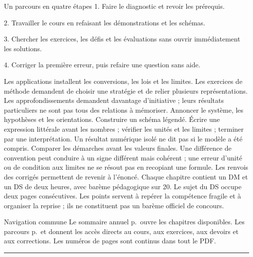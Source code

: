 \thispagestyle{mpsiFront}
\begin{loi}{Un parcours en quatre étapes}
1. Faire le diagnostic et revoir les prérequis.\par
2. Travailler le cours en refaisant les démonstrations et les schémas.\par
3. Chercher les exercices, les défis et les évaluations sans ouvrir immédiatement les solutions.\par
4. Corriger la première erreur, puis refaire une question sans aide.
\end{loi}
Les applications installent les conversions, les lois et les limites. Les exercices de méthode demandent de choisir une stratégie et de relier plusieurs représentations. Les approfondissements demandent davantage d’initiative ; leurs résultats particuliers ne sont pas tous des relations à mémoriser.
Annoncer le système, les hypothèses et les orientations. Construire un schéma légendé. Écrire une expression littérale avant les nombres ; vérifier les unités et les limites ; terminer par une interprétation. Un résultat numérique isolé ne dit pas si le modèle a été compris.
Comparer les démarches avant les valeurs finales. Une différence de convention peut conduire à un signe différent mais cohérent ; une erreur d’unité ou de condition aux limites ne se résout pas en recopiant une formule. Les renvois des corrigés permettent de revenir à l’énoncé.
Chaque chapitre contient un DM et un DS de deux heures, avec barème pédagogique sur 20. Le sujet du DS occupe deux pages consécutives. Les points servent à repérer la compétence fragile et à organiser la reprise ; ils ne constituent pas un barème officiel de concours.
\begin{methode}{Navigation commune}
Le sommaire annuel p.\,\pageref{sommaire-livre} ouvre les chapitres disponibles. Les parcours p.\,\pageref{navigation-1} et \pageref{navigation-2} donnent les accès directs au cours, aux exercices, aux devoirs et aux corrections. Les numéros de pages sont continus dans tout le PDF.
\end{methode}


\thispagestyle{mpsiFront}
\begingroup\setlength{\parskip}{0pt}\fontsize{10}{13.5}\selectfont\endgroup
\vspace{2mm}\hrule\vspace{2mm}


